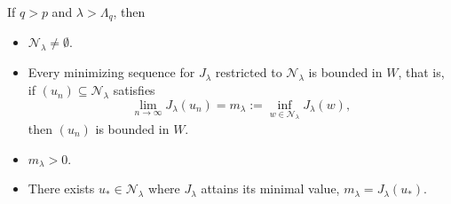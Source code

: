 \documentclass[10pt,a4paper]{amsart}
\begin{document}
\begin{lem}\label{2-exist-eigen}
     If $q>p$ and $\lambda>\Lambda_q$, then
     \begin{itemize}
         \item[(i)] $ \mathcal{N}_{\lambda}\neq \emptyset.$
         \item[(ii)] Every minimizing sequence  for $J_{\lambda}$ restricted to $\mathcal{N}_{\lambda}$ is bounded in $W$, that is, if $\left(u_{n}\right) \subseteq \mathcal{N}_{\lambda}$ satisfies 
\begin{equation}\label{Jlambda}
\lim_{n\to \infty} J_\lambda (u_n) = m_{\lambda} :=\inf _{w \in \mathcal{N}_{\lambda}} J_{\lambda}(w), 
\end{equation}
then $(u_n)$ is bounded in $W$.
         \item[(iii)]  $m_{\lambda}>0$.
         \item[(iv)] 
     There exists $u_{*} \in \mathcal{N}_{\lambda}$ where ${J}_{\lambda}$ attains its minimal value, $\displaystyle {m_{\lambda}=J_{\lambda}(u_*)}$.
     \end{itemize}
     
\end{lem}
\end{document}
